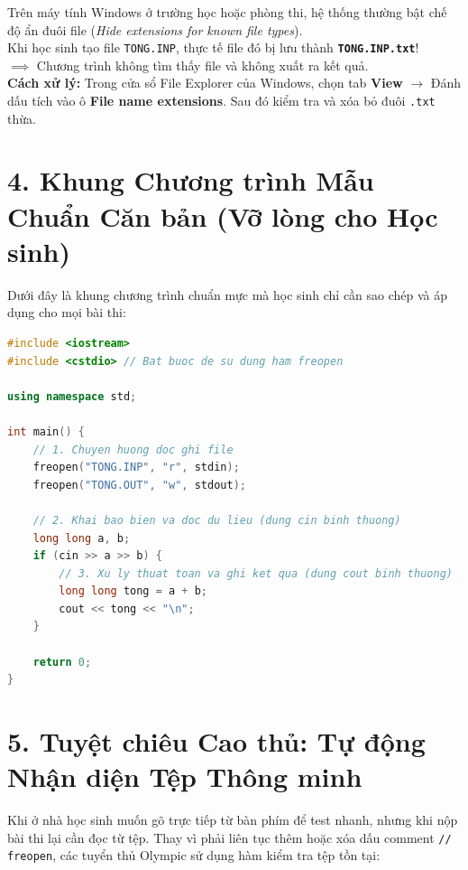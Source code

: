 \documentclass[11pt,a4paper]{article}
\begin{document}
\vspace{-1mm}
\begin{tcolorbox}[colback=red!5!white,colframe=red!75!black,arc=1mm,title=\textbf{\footnotesize BẪY CỰC NGUY HIỂM TRÊN HỆ ĐIỀU HÀNH WINDOWS: ẨN ĐUÔI TỆP .TXT}]
\footnotesize
Trên máy tính Windows ở trường học hoặc phòng thi, hệ thống thường bật chế độ ẩn đuôi file (\textit{Hide extensions for known file types}).\\
Khi học sinh tạo file \texttt{TONG.INP}, thực tế file đó bị lưu thành \textbf{\texttt{TONG.INP.txt}}!\\
$\implies$ Chương trình không tìm thấy file và không xuất ra kết quả.\\
\textbf{Cách xử lý:} Trong cửa sổ File Explorer của Windows, chọn tab \textbf{View} $\to$ Đánh dấu tích vào ô \textbf{File name extensions}. Sau đó kiểm tra và xóa bỏ đuôi \texttt{.txt} thừa.
\end{tcolorbox}

\newpage

\section*{\color{AsianDarkBlue}\normalsize 4. Khung Chương trình Mẫu Chuẩn Căn bản (Vỡ lòng cho Học sinh)}
Dưới đây là khung chương trình chuẩn mực mà học sinh chỉ cần sao chép và áp dụng cho mọi bài thi:

\begin{lstlisting}[language=C++]
#include <iostream>
#include <cstdio> // Bat buoc de su dung ham freopen

using namespace std;

int main() {
    // 1. Chuyen huong doc ghi file
    freopen("TONG.INP", "r", stdin);
    freopen("TONG.OUT", "w", stdout);

    // 2. Khai bao bien va doc du lieu (dung cin binh thuong)
    long long a, b;
    if (cin >> a >> b) {
        // 3. Xu ly thuat toan va ghi ket qua (dung cout binh thuong)
        long long tong = a + b;
        cout << tong << "\n";
    }

    return 0;
}
\end{lstlisting}

\vspace{-2mm}
\section*{\color{AsianDarkBlue}\normalsize 5. Tuyệt chiêu Cao thủ: Tự động Nhận diện Tệp Thông minh}
Khi ở nhà học sinh muốn gõ trực tiếp từ bàn phím để test nhanh, nhưng khi nộp bài thi lại cần đọc từ tệp. Thay vì phải liên tục thêm hoặc xóa dấu comment \texttt{// freopen}, các tuyển thủ Olympic sử dụng hàm kiểm tra tệp tồn tại:
\end{document}
